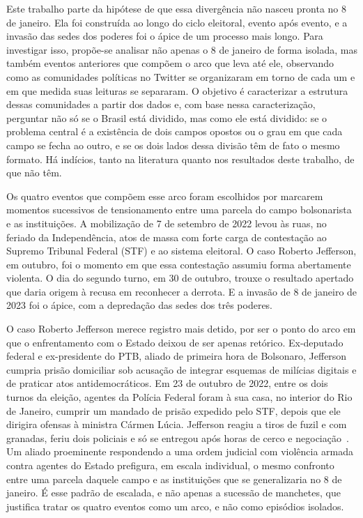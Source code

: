 \documentclass[conference]{IEEEtran}
\begin{document}
Este trabalho parte da hipótese de que essa divergência não nasceu pronta no 8 de janeiro. Ela foi construída ao longo do ciclo eleitoral, evento após evento, e a invasão das sedes dos poderes foi o ápice de um processo mais longo. Para investigar isso, propõe-se analisar não apenas o 8 de janeiro de forma isolada, mas também eventos anteriores que compõem o arco que leva até ele, observando como as comunidades políticas no Twitter se organizaram em torno de cada um e em que medida suas leituras se separaram. O objetivo é caracterizar a estrutura dessas comunidades a partir dos dados e, com base nessa caracterização, perguntar não só se o Brasil está dividido, mas como ele está dividido: se o problema central é a existência de dois campos opostos ou o grau em que cada campo se fecha ao outro, e se os dois lados dessa divisão têm de fato o mesmo formato. Há indícios, tanto na literatura quanto nos resultados deste trabalho, de que não têm. 

Os quatro eventos que compõem esse arco foram escolhidos por marcarem momentos sucessivos de tensionamento entre uma parcela do campo bolsonarista e as instituições. A mobilização de 7 de setembro de 2022 levou às ruas, no feriado da Independência, atos de massa com forte carga de contestação ao Supremo Tribunal Federal (STF) e ao sistema eleitoral. O caso Roberto Jefferson, em outubro, foi o momento em que essa contestação assumiu forma abertamente violenta. O dia do segundo turno, em 30 de outubro, trouxe o resultado apertado que daria origem à recusa em reconhecer a derrota. E a invasão de 8 de janeiro de 2023 foi o ápice, com a depredação das sedes dos três poderes.

O caso Roberto Jefferson merece registro mais detido, por ser o ponto do arco em que o enfrentamento com o Estado deixou de ser apenas retórico. Ex-deputado federal e ex-presidente do PTB, aliado de primeira hora de Bolsonaro, Jefferson cumpria prisão domiciliar sob acusação de integrar esquemas de milícias digitais e de praticar atos antidemocráticos. Em 23 de outubro de 2022, entre os dois turnos da eleição, agentes da Polícia Federal foram à sua casa, no interior do Rio de Janeiro, cumprir um mandado de prisão expedido pelo STF, depois que ele dirigira ofensas à ministra Cármen Lúcia. Jefferson reagiu a tiros de fuzil e com granadas, feriu dois policiais e só se entregou após horas de cerco e negociação~\cite{b_rj2022}. Um aliado proeminente respondendo a uma ordem judicial com violência armada contra agentes do Estado prefigura, em escala individual, o mesmo confronto entre uma parcela daquele campo e as instituições que se generalizaria no 8 de janeiro. É esse padrão de escalada, e não apenas a sucessão de manchetes, que justifica tratar os quatro eventos como um arco, e não como episódios isolados.
\end{document}
